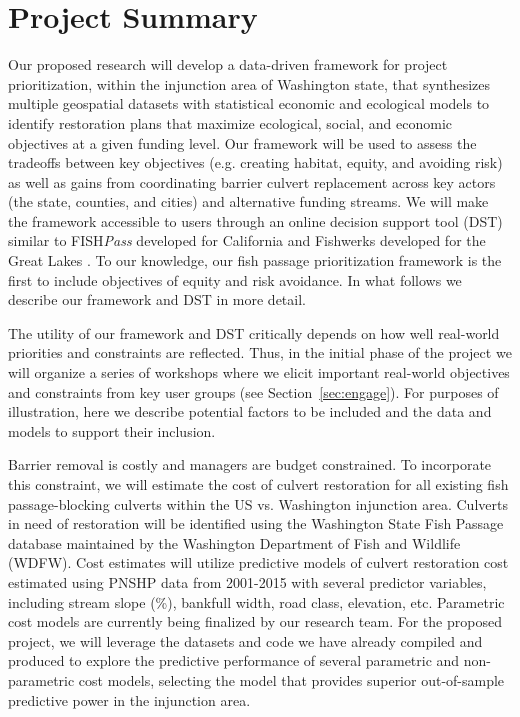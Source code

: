 \documentclass[12pt]{elsarticle}
\begin{document}
\section{Project Summary}\label{sec:summary} %

Our proposed research will develop a data-driven framework for project prioritization, within the injunction area of Washington state, that synthesizes multiple geospatial datasets with statistical economic and ecological models to identify restoration plans that maximize ecological, social, and economic objectives at a given funding level. Our framework will be used to assess the tradeoffs between key objectives (e.g. creating habitat, equity, and avoiding risk) as well as gains from coordinating barrier culvert replacement across key actors (the state, counties, and cities) and alternative funding streams. We will make the framework accessible to users through an online decision support tool (DST) similar to FISH\emph{Pass} developed for California \citep{optipass2015migratory} and Fishwerks developed for the Great Lakes \citep{moody2017pet}. To our knowledge, our fish passage prioritization framework is the first to include objectives of equity and risk avoidance. In what follows we describe our framework and DST in more detail.

The utility of our framework and DST critically depends on how well real-world priorities and constraints are reflected. Thus, in the initial phase of the project we will organize a series of workshops where we elicit important real-world objectives and constraints from key user groups (see Section~\ref{sec:engage}). For purposes of illustration, here we describe potential factors to be included and the data and models to support their inclusion.   

Barrier removal is costly and managers are budget constrained. To incorporate this constraint, we will estimate the cost of culvert restoration for all existing fish passage-blocking culverts within the US vs. Washington injunction area. Culverts in need of restoration will be identified using the Washington State Fish Passage database maintained by the Washington Department of Fish and Wildlife (WDFW). Cost estimates will utilize predictive models of culvert restoration cost estimated using PNSHP data from 2001-2015 with several predictor variables, including stream slope (\%), bankfull width, road class, elevation, etc. Parametric cost models are currently being finalized by our research team. For the proposed project, we will leverage the datasets and code we have already compiled and produced to explore the predictive performance of several parametric and non-parametric cost models, selecting the model that provides superior out-of-sample predictive power in the injunction area.
\end{document}
